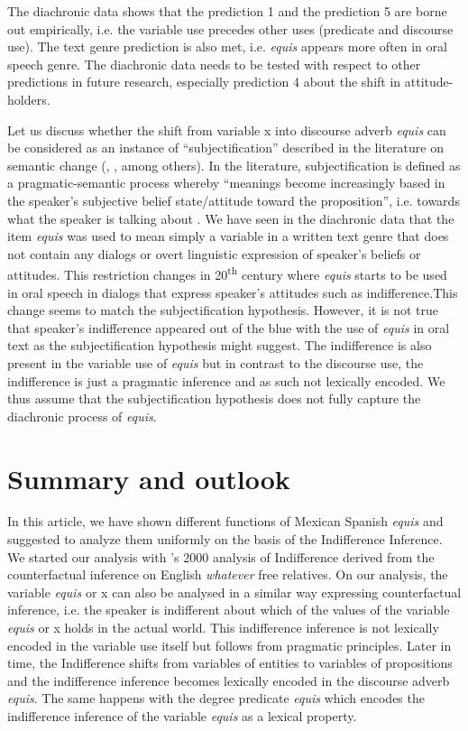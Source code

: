 \documentclass[output=paper
,modfonts
,nonflat]{langsci/langscibook}
\begin{document}
The diachronic data shows that the prediction 1 and the prediction 5 are borne out empirically, i.e. the variable use precedes other uses (predicate and discourse use). The text genre prediction is also met, i.e. \textit{equis} appears more often in oral speech genre. The diachronic data needs to be tested with respect to other predictions in future research, especially prediction 4 about the shift in attitude-holders. 
 
Let us discuss whether the shift from variable x into discourse adverb \textit{equis} can be considered as an instance of “subjectification” described in the literature on semantic change (\citealt{Traugott1995}, \citealt{Company2003}, among others). In the literature, subjectification is defined as a pragmatic-semantic process whereby “meanings become increasingly based in the speaker’s subjective belief state/attitude toward the proposition”, i.e. towards what the speaker is talking about \citep[31]{Traugott1995}. We have seen in the diachronic data that the item \textit{equis} was used to mean simply a variable in a written text genre that does not contain any dialogs or overt linguistic expression of speaker’s beliefs or attitudes. This restriction changes in 20\textsuperscript{th} century where \textit{equis} starts to be used in oral speech in dialogs that express speaker’s attitudes such as indifference.This change seems to match the subjectification hypothesis. However, it is not true that speaker’s indifference appeared out of the blue with the use of \textit{equis} in oral text as the subjectification hypothesis might suggest. The indifference is also present in the variable use of \textit{equis} but in contrast to the discourse use, the indifference is just a pragmatic inference and as such not lexically encoded. We thus assume that the subjectification hypothesis does not fully capture the diachronic process of \textit{equis}.

\section{Summary and outlook}\label{sec:kellert:6}
In this article, we have shown different functions of Mexican Spanish \textit{equis} and suggested to analyze them uniformly on the basis of the Indifference Inference. We started our analysis with \citeauthor{Fintel2000}’s 2000 analysis of Indifference derived from the counterfactual inference on English \textit{whatever} free relatives. On our analysis, the variable \textit{equis} or x can also be analysed in a similar way expressing counterfactual inference, i.e. the speaker is indifferent about which of the values of the variable \textit{equis} or x holds in the actual world. This indifference inference is not lexically encoded in the variable use itself but follows from pragmatic principles. Later in time, the Indifference shifts from variables of entities to variables of propositions and the indifference inference becomes lexically encoded in the discourse adverb \textit{equis}. The same happens with the degree predicate \textit{equis} which encodes the indifference inference of the variable \textit{equis} as a lexical property.
 
\end{document}
